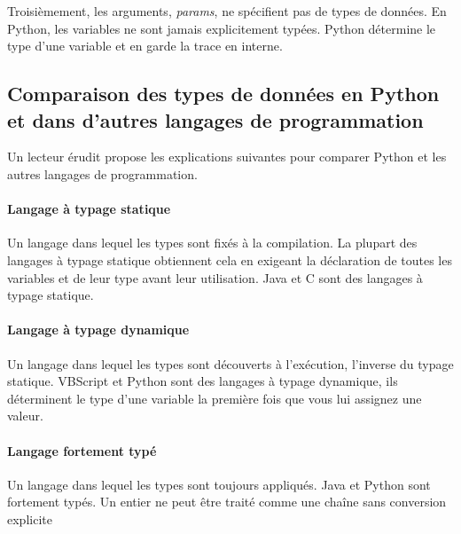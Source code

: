\medskip
{}

\medskip
Troisièmement, les arguments, \emph{params}, ne spécifient pas de types de données. En Python, les variables ne sont jamais explicitement typées. Python détermine le type d'une variable et en garde la trace en interne.

\medskip
{}

\subsection{Comparaison des types de données en Python et dans d'autres langages de programmation}

Un lecteur érudit propose les explications suivantes pour comparer Python et les autres langages de programmation.

\paragraph*{Langage à typage statique}
Un langage dans lequel les types sont fixés à la compilation. La plupart des langages à typage statique obtiennent cela en exigeant la déclaration de toutes les variables et de leur type avant leur utilisation. Java et C sont des langages à typage statique.

\paragraph*{Langage à typage dynamique}
Un langage dans lequel les types sont découverts à l'exécution, l'inverse du typage statique. VBScript et Python sont des langages à typage dynamique, ils déterminent le type d'une variable la première fois que vous lui assignez une valeur.

\paragraph{Langage fortement typé}
Un langage dans lequel les types sont toujours appliqués. Java et Python sont fortement typés. Un entier ne peut être traité comme une chaîne sans conversion explicite

